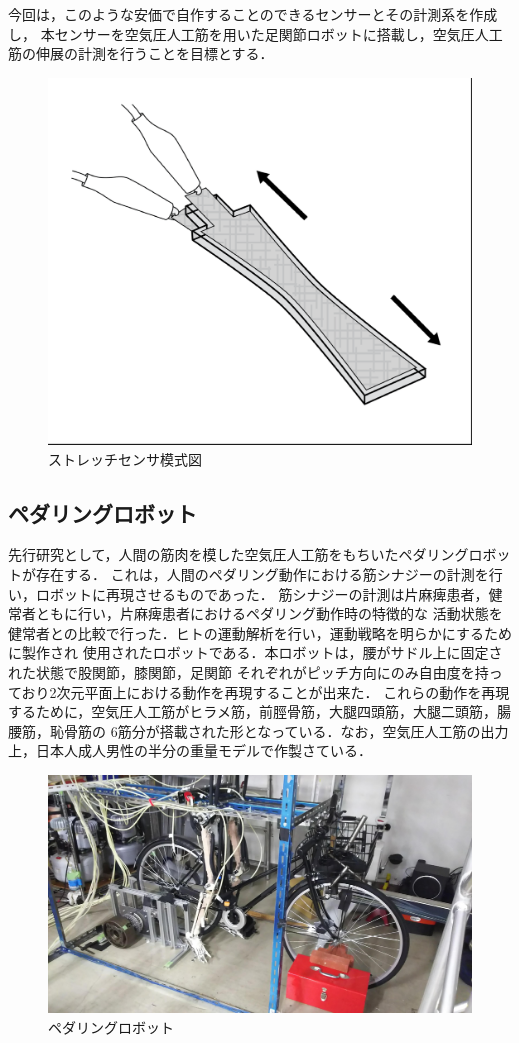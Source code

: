 今回は，このような安価で自作することのできるセンサーとその計測系を作成し，
本センサーを空気圧人工筋を用いた足関節ロボットに搭載し，空気圧人工筋の伸展の計測を行うことを目標とする．
\begin{figure}[h]
    \begin{center}
        \includegraphics[width=0.5\columnwidth]{./1_prolusion/MITSoftRobotics.eps}
        \caption{ストレッチセンサ模式図\cite{MITSoftRobot}}
        \label{MITSoftRobot表紙}
    \end{center}
\end{figure}

\subsection{ペダリングロボット}

先行研究として，人間の筋肉を模した空気圧人工筋をもちいたペダリングロボットが存在する．
これは，人間のペダリング動作における筋シナジーの計測を行い，ロボットに再現させるものであった．
筋シナジーの計測は片麻痺患者，健常者ともに行い，片麻痺患者におけるペダリング動作時の特徴的な
活動状態を健常者との比較で行った．ヒトの運動解析を行い，運動戦略を明らかにするために製作され
使用されたロボットである．本ロボットは，腰がサドル上に固定された状態で股関節，膝関節，足関節
それぞれがピッチ方向にのみ自由度を持っており2次元平面上における動作を再現することが出来た．
これらの動作を再現するために，空気圧人工筋がヒラメ筋，前脛骨筋，大腿四頭筋，大腿二頭筋，腸腰筋，恥骨筋の
6筋分が搭載された形となっている．なお，空気圧人工筋の出力上，日本人成人男性の半分の重量モデルで作製さている．%
\begin{figure}[h]
 \begin{center}
  \includegraphics[width=0.75\columnwidth,clip]{./1_prolusion/1st.eps}
  \caption{ペダリングロボット}
  \label{初号機}
  \end{center} %
\end{figure}

